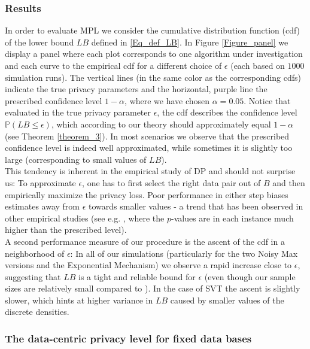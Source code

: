 \documentclass[conference]{IEEEtran}
\begin{document}
\subsubsection*{\textbf{Results}} 
In order to evaluate MPL we consider the cumulative distribution function (cdf) of the lower bound $LB$ defined in \eqref{Eq_def_LB}. In Figure \ref{Figure_panel} we display a panel where each plot corresponds to one algorithm under investigation and each curve to the empirical cdf for a different choice of $\epsilon$ (each based on $1000$ simulation runs). The vertical lines (in the same color as the corresponding cdfs) indicate the true privacy parameters and the horizontal, purple line the prescribed confidence level $1-\alpha$, where we have chosen $\alpha = 0.05$. Notice that evaluated in the true privacy parameter $\epsilon$, the cdf describes the confidence level $\mathbb{P}(LB \le \epsilon)$, which according to our theory should approximately equal $1-\alpha$ (see Theorem \ref{theorem_3}). In most scenarios we observe that the prescribed confidence level is indeed well approximated, while sometimes it is slightly too large (corresponding to small values of $LB$).\\
This tendency is inherent in the empirical study of DP and should not surprise us: To approximate $\epsilon$, one has to first select the right data pair out of $B$ and then empirically maximize the privacy loss. Poor performance in either step biases estimates away from $\epsilon$ towards smaller values - a trend that has been observed in other empirical studies (see e.g. \cite{StatDP}, where the $p$-values are in each instance much higher than the prescribed level). \\
A second performance measure of our procedure is the ascent of the cdf in a neighborhood of $\epsilon$: In all of our simulations (particularly for the two Noisy Max versions and the Exponential Mechanism) we observe a rapid increase close to $\epsilon$, suggesting that $LB$ is a tight and reliable bound for $\epsilon$ (even though our sample sizes are relatively small compared to \cite{StatDP}). In the case of SVT the ascent is slightly slower, which hints at higher variance in $LB$ caused by smaller values of the discrete densities.




\subsubsection*{\textbf{The data-centric privacy level for fixed data bases}} 
\end{document}
